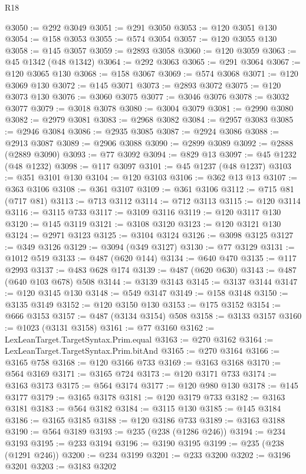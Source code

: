 \begin{lexlean}{R18}
\begin{coremodule}
@3050 := @292 @3049
@3051 := @291 @3050
@3053 := @120 @3051 @130
@3054 := @158 @3053
@3055 := @574 @3054
@3057 := @120 @3055 @130
@3058 := @145 @3057
@3059 := @2893 @3058
@3060 := @120 @3059
@3063 := @45 @1342 (@48 @1342)
@3064 := @292 @3063
@3065 := @291 @3064
@3067 := @120 @3065 @130
@3068 := @158 @3067
@3069 := @574 @3068
@3071 := @120 @3069 @130
@3072 := @145 @3071
@3073 := @2893 @3072
@3075 := @120 @3073 @130
@3076 := @3060 @3075
@3077 := @3046 @3076
@3078 := @3032 @3077
@3079 := @3018 @3078
@3080 := @3004 @3079
@3081 := @2990 @3080
@3082 := @2979 @3081
@3083 := @2968 @3082
@3084 := @2957 @3083
@3085 := @2946 @3084
@3086 := @2935 @3085
@3087 := @2924 @3086
@3088 := @2913 @3087
@3089 := @2906 @3088
@3090 := @2899 @3089
@3092 := @2888 (@2889 @3090)
@3093 := @77 @3092
@3094 := @829 @13
@3097 := @45 @1232 (@48 @1232)
@3098 := @117 @3097
@3101 := @45 @1237 (@48 @1237)
@3103 := @351 @3101 @130
@3104 := @120 @3103
@3106 := @362 @13 @13
@3107 := @363 @3106
@3108 := @361 @3107
@3109 := @361 @3106
@3112 := @715 @81 (@717 @81)
@3113 := @713 @3112
@3114 := @712 @3113
@3115 := @120 @3114
@3116 := @3115 @733
@3117 := @3109 @3116
@3119 := @120 @3117 @130
@3120 := @145 @3119
@3121 := @3108 @3120
@3123 := @120 @3121 @130
@3124 := @2971 @3123
@3125 := @3104 @3124
@3126 := @3098 @3125
@3127 := @349 @3126
@3129 := @3094 (@349 @3127)
@3130 := @77 @3129
@3131 := @1012 @519
@3133 := @487 (@620 @144)
@3134 := @640 @470
@3135 := @117 @2993
@3137 := @483 @628 @174
@3139 := @487 (@620 @630)
@3143 := @487 (@640 @103 @678) @508
@3144 := @3139 @3143
@3145 := @3137 @3144
@3147 := @120 @3145 @130
@3148 := @549 @3147
@3149 := @158 @3148
@3150 := @3135 @3149
@3152 := @120 @3150 @130
@3153 := @175 @3152
@3154 := @666 @3153
@3157 := @487 (@3134 @3154) @508
@3158 := @3133 @3157
@3160 := @1023 (@3131 @3158)
@3161 := @77 @3160
@3162 := LexLeanTarget.TargetSyntax.Prim.equal
@3163 := @270 @3162
@3164 := LexLeanTarget.TargetSyntax.Prim.bitAnd
@3165 := @270 @3164
@3166 := @3165 @758
@3168 := @120 @3166 @733
@3169 := @3163 @3168
@3170 := @564 @3169
@3171 := @3165 @724
@3173 := @120 @3171 @733
@3174 := @3163 @3173
@3175 := @564 @3174
@3177 := @120 @980 @130
@3178 := @145 @3177
@3179 := @3165 @3178
@3181 := @120 @3179 @733
@3182 := @3163 @3181
@3183 := @564 @3182
@3184 := @3115 @130
@3185 := @145 @3184
@3186 := @3165 @3185
@3188 := @120 @3186 @733
@3189 := @3163 @3188
@3190 := @564 @3189
@3193 := @235 (@238 (@1286 @246))
@3194 := @234 @3193
@3195 := @233 @3194
@3196 := @3190 @3195
@3199 := @235 (@238 (@1291 @246))
@3200 := @234 @3199
@3201 := @233 @3200
@3202 := @3196 @3201
@3203 := @3183 @3202

\end{coremodule}
\end{lexlean}
